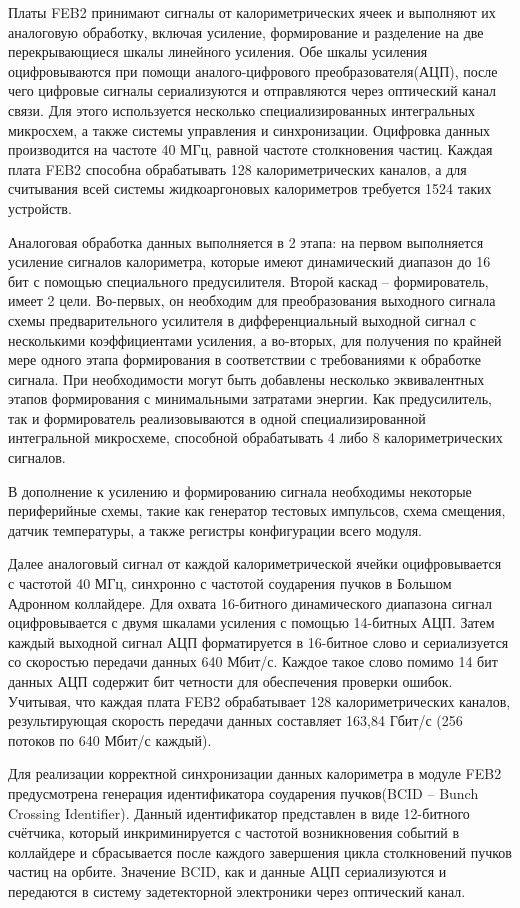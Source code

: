 Платы FEB2 принимают сигналы от калориметрических ячеек и выполняют их аналоговую обработку, включая усиление, формирование и разделение на две перекрывающиеся шкалы линейного усиления. Обе шкалы усиления оцифровываются при помощи аналого-цифрового преобразователя(АЦП), после чего цифровые сигналы сериализуются и отправляются через оптический канал связи. Для этого используется несколько специализированных интегральных микросхем, а также системы управления и синхронизации. Оцифровка данных производится на частоте 40 МГц, равной частоте столкновения частиц. Каждая плата FEB2 способна обрабатывать 128 калориметрических каналов, а для считывания всей системы жидкоаргоновых калориметров требуется 1524 таких устройств.\par
Аналоговая обработка данных выполняется в 2 этапа: на первом выполняется усиление сигналов калориметра, которые имеют динамический диапазон до 16 бит с помощью специального предусилителя. Второй каскад -- формирователь, имеет 2 цели. Во-первых, он необходим для преобразования выходного сигнала схемы предварительного усилителя в дифференциальный выходной сигнал с несколькими коэффициентами усиления, а во-вторых, для получения по крайней мере одного этапа формирования в соответствии с требованиями к обработке сигнала. При необходимости могут быть добавлены несколько эквивалентных этапов формирования с минимальными затратами энергии. Как предусилитель, так и формирователь реализовываются в одной специализированной интегральной микросхеме, способной обрабатывать 4 либо 8 калориметрических сигналов.\par
В дополнение к усилению и формированию сигнала необходимы некоторые периферийные схемы, такие как генератор тестовых импульсов, схема смещения, датчик температуры, а также регистры конфигурации всего модуля.\par
Далее аналоговый сигнал от каждой калориметрической ячейки оцифровывается с частотой 40 МГц, синхронно с частотой соударения пучков в Большом Адронном коллайдере. Для охвата 16-битного динамического диапазона сигнал оцифровывается с двумя шкалами усиления с помощью 14-битных АЦП. Затем каждый выходной сигнал АЦП форматируется в 16-битное слово и сериализуется со скоростью передачи данных 640 Мбит/с. Каждое такое слово помимо 14 бит данных АЦП содержит бит четности для обеспечения проверки ошибок. Учитывая, что каждая плата FEB2 обрабатывает 128 калориметрических каналов, результирующая скорость передачи данных составляет 163,84 Гбит/с (256 потоков по 640 Мбит/с каждый).\par
Для реализации корректной синхронизации данных калориметра в модуле FEB2 предусмотрена генерация идентификатора соударения пучков(BCID -- Bunch Crossing Identifier). Данный идентификатор представлен в виде 12-битного счётчика, который инкриминируется с частотой возникновения событий в коллайдере и сбрасывается после каждого завершения цикла столкновений пучков частиц на орбите. Значение BCID, как и данные АЦП сериализуются и передаются в систему задетекторной электроники через оптический канал.\par
